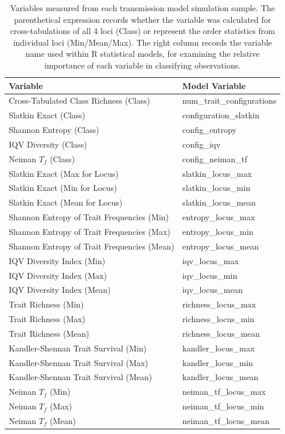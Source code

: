 \begin{table}[ht]
\begin{tabular}{ll}
\hline
Variable                                    & Model Variable \\ 
\hline
Cross-Tabulated Class Richness  (Class)         &  num\_trait\_configurations      \\
Slatkin Exact (Class)           & configuration\_slatkin       \\
Shannon Entropy (Class)  &  config\_entropy \\
IQV Diversity (Class)  & config\_iqv \\
Neiman $T_f$ (Class) & config\_neiman\_tf \\
Slatkin Exact (Max for Locus)                    & slatkin\_locus\_max       \\
Slatkin Exact (Min for Locus)                     & slatkin\_locus\_min      \\
Slatkin Exact (Mean for Locus)                   & slatkin\_locus\_mean       \\
Shannon Entropy of Trait Frequencies (Min)      & entropy\_locus\_max       \\
Shannon Entropy of Trait Frequencies (Max)       & entropy\_locus\_min      \\
Shannon Entropy of Trait Frequencies (Mean)      & entropy\_locus\_mean      \\
IQV Diversity Index (Min)     & iqv\_locus\_max \\
IQV Diversity Index (Max)     & iqv\_locus\_min \\
IQV Diversity Index (Mean)    & iqv\_locus\_mean \\
Trait Richness (Min)   & richness\_locus\_max \\ 
Trait Richness (Max)   & richness\_locus\_min \\
Trait Richness (Mean)    & richness\_locus\_mean \\
Kandler-Shennan Trait Survival (Min)   & kandler\_locus\_max \\
Kandler-Shennan Trait Survival (Max)   & kandler\_locus\_min \\
Kandler-Shennan Trait Survival (Mean)   & kandler\_locus\_mean \\
Neiman $T_f$ (Min)   & neiman\_tf\_locus\_max \\
Neiman $T_f$ (Max)   & neiman\_tf\_locus\_min \\
Neiman $T_f$ (Mean)   & neiman\_tf\_locus\_mean \\
\hline

\end{tabular}

\caption{Variables measured from each transmission model simulation sample.  The parenthetical expression records whether the variable was calculated for cross-tabulations of all 4 loci (Class) or represent the order statistics from individual loci (Min/Mean/Max).  The right column records the variable name used within R statistical models, for examining the relative importance of each variable in classifying observations.}
\label{tab:variables}
\end{table}

